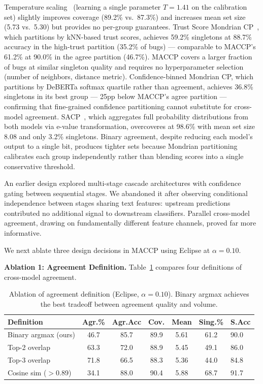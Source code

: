 \documentclass[conference]{IEEEtran}
\newcommand{\pp}{\text{pp}}
\begin{document}
Temperature scaling~\cite{guo2017calibration} (learning a single parameter $T{=}1.41$ on the calibration set) slightly improves coverage (89.2\% vs.\ 87.3\%) and increases mean set size (5.73 vs.\ 5.30) but provides no per-group guarantees. Trust Score Mondrian CP~\cite{kaur2025trust}, which partitions by kNN-based trust scores, achieves 59.2\% singletons at 88.7\% accuracy in the high-trust partition (35.2\% of bugs) --- comparable to MACCP's 61.2\% at 90.0\% in the agree partition (46.7\%). MACCP covers a larger fraction of bugs at similar singleton quality and requires no hyperparameter selection (number of neighbors, distance metric). Confidence-binned Mondrian CP, which partitions by DeBERTa softmax quartile rather than agreement, achieves 36.8\% singletons in its best group --- 25$\pp$ below MACCP's agree partition --- confirming that fine-grained confidence partitioning cannot substitute for cross-model agreement. SACP~\cite{alami2025sacp}, which aggregates full probability distributions from both models via e-value transformation, overcoveres at 98.6\% with mean set size 8.08 and only 3.2\% singletons. Binary agreement, despite reducing each model's output to a single bit, produces tighter sets because Mondrian partitioning calibrates each group independently rather than blending scores into a single conservative threshold.

An earlier design explored multi-stage cascade architectures with confidence gating between sequential stages. We abandoned it after observing conditional independence between stages sharing text features: upstream predictions contributed no additional signal to downstream classifiers. Parallel cross-model agreement, drawing on fundamentally different feature channels, proved far more informative.

\smallskip
We next ablate three design decisions in MACCP using Eclipse at $\alpha = 0.10$.

\smallskip\noindent\textbf{Ablation 1: Agreement Definition.}
Table~\ref{tab:ablation-agree-def} compares four definitions of cross-model agreement.

\begin{table}[t]
\caption{Ablation of agreement definition (Eclipse, $\alpha = 0.10$). Binary argmax achieves the best tradeoff between agreement quality and volume.}
\label{tab:ablation-agree-def}
\centering
\footnotesize
\setlength{\tabcolsep}{2pt}
\begin{tabular}{@{}lcccccl@{}}
\toprule
\textbf{Definition} & \textbf{Agr.\%} & \textbf{Agr.Acc} & \textbf{Cov.} & \textbf{Mean} & \textbf{Sing.\%} & \textbf{S.Acc} \\
\midrule
Binary argmax (ours) & 46.7 & 85.7 & 89.9 & 5.61 & 61.2 & 90.0 \\
Top-2 overlap         & 63.3 & 72.0 & 88.9 & 5.45 & 49.1 & 86.0 \\
Top-3 overlap         & 71.8 & 66.5 & 88.3 & 5.36 & 44.0 & 84.8 \\
Cosine sim ($>$0.89)  & 34.1 & 88.0 & 90.4 & 5.88 & 68.7 & 91.7 \\
\bottomrule
\end{tabular}
\end{table}
\end{document}

